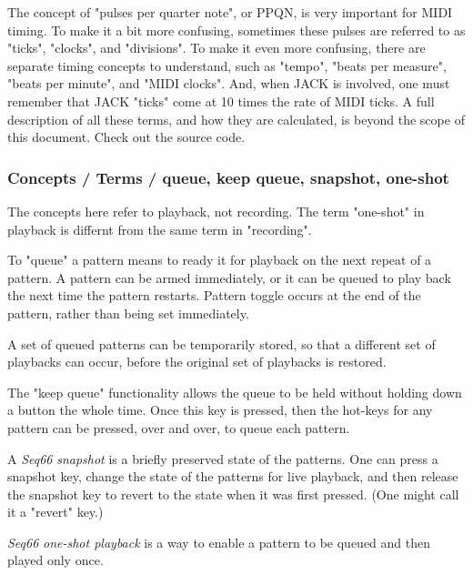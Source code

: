    The concept of "pulses per quarter note", or PPQN, is very important for
   MIDI timing.  To make it a bit more confusing, sometimes these pulses are
   referred to as "ticks", "clocks", and "divisions".
   To make it even more confusing, there are separate timing concepts to
   understand, such as "tempo", "beats per measure", "beats per minute", and
   "MIDI clocks".
   And, when JACK is involved, one must remember that JACK "ticks" come at 10
   times the rate of MIDI ticks.
   A full description of all these terms, and how they are calculated, is
   beyond the scope of this document.  Check out the source code.

\subsubsection{Concepts / Terms / queue, keep queue, snapshot, one-shot}
\label{subsubsec:concepts_terms_queue_mode}

   The concepts here refer to playback, not recording.  The term "one-shot" in
   playback is differnt from the same term in "recording".

   To "queue" a pattern means to ready it for playback on the next repeat of
   a pattern.  A pattern can be armed immediately, or it can be queued to
   play back the next time the pattern restarts.
   Pattern toggle occurs at the end of the pattern,
   rather than being set immediately.

   A set of queued patterns can be temporarily stored, so that a different
   set of playbacks can occur, before the original set of playbacks is
   restored.

   The "keep queue" functionality allows the queue to be held without
   holding down a button the whole time.  Once this key is pressed,
   then the hot-keys for any pattern can be pressed, over and over,
   to queue each pattern.

   A \textsl{Seq66} \textsl{snapshot} is a briefly preserved
   state of the patterns.  One can press a snapshot key, change the state of
   the patterns for live playback, and then release the snapshot key to
   revert to the state when it was first pressed.  (One might call it a
   "revert" key.)

   \textsl{Seq66} \textsl{one-shot playback} is a way to enable a pattern to be
   queued and then played only once.

